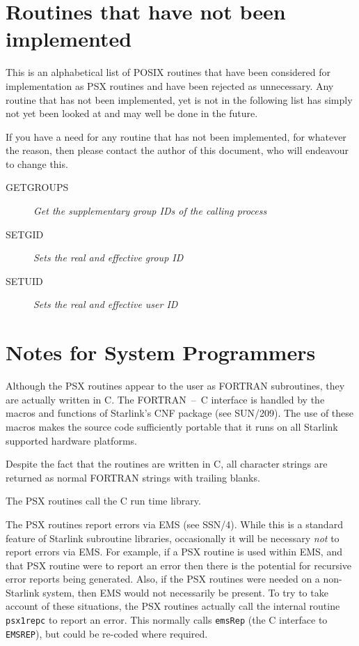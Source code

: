 \documentclass[twoside,11pt]{article}
\newcommand{\latex}[1]{#1}
\newcommand{\xref}[3]{#1}
\newcommand{\xlabel}[1]{}
\renewcommand{\_}{\texttt{\symbol{95}}}
\newcommand{\listline}{\hspace{1pt}\\}
\renewcommand{\listline}{}
\newcommand{\notimproutine}[4]{\item [#1 #3] \listline
\textit{#4} }
\begin{document}
\newpage
\section{\xlabel{routines_that_have_not_been_implemented}Routines that have not been implemented}
\label{not-implelmented}

This is an alphabetical list of POSIX routines that have been considered for
implementation as PSX routines and have been rejected as unnecessary. Any
routine that has not been implemented, yet is not in the following list has
simply not yet been looked at and may well be done in the future.

If you have a need for any routine that has not been implemented, for whatever
the reason, then please contact the author of this document, who will endeavour
to change this.
\begin{description}
\notimproutine{GETGROUPS}{}{}
            {Get the supplementary group IDs of the calling process}
\notimproutine{SETGID}{}{}
            {Sets the real and effective group ID}
\notimproutine{SETUID}{}{}
            {Sets the real and effective user ID}
\end{description}

\section{\xlabel{notes_for_system_programmers}Notes for System Programmers}

Although the PSX routines appear to the user as FORTRAN subroutines,
they are actually written in C. The FORTRAN~--~C interface is handled
by the macros and functions of Starlink's
\xref{CNF}{sun209}{abstract}
package\latex{ (see SUN/209)}.
The use of these macros makes the source code sufficiently portable that it
runs on all Starlink supported hardware platforms.

Despite the fact that the routines are written in C, all character strings are
returned as normal FORTRAN strings with trailing blanks.

The PSX routines call the C run time library.

The PSX routines report errors via
\xref{EMS}{ssn4}{abstract}\latex{ (see SSN/4)}.
While this is a standard
feature of Starlink subroutine libraries, occasionally it will be
necessary \emph{not} to report errors via EMS. For example, if a PSX routine
is used within EMS, and that PSX routine were to report an error then
there is the potential for recursive error reports being generated.
Also, if the PSX routines were needed on a non-Starlink system, then
EMS would not necessarily be present. To try to take account of these
situations, the PSX routines actually call the internal routine
\texttt{psx1\_rep\_c} to report an error. This normally calls 
\texttt{emsRep} (the C interface to
\xref{\texttt{EMS\_REP}}{ssn4}{EMS_REP}),
but could be re-coded where required.

\end{document}
